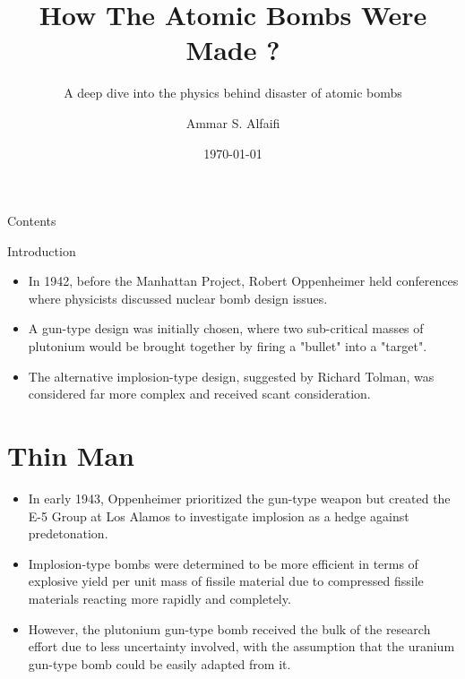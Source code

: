 \documentclass{loyola-beamer}
\title{How The Atomic Bombs Were Made ?}
\subtitle{A deep dive into the physics behind disaster of atomic bombs}
\author{Ammar S. Alfaifi}
\date{\today}
\institute{KFUPM}
\begin{document}
\begin{titleframe}{}
	\maketitle
\end{titleframe}

\begin{frame}{Contents}
	\tableofcontents
\end{frame}

\begin{frame}{Introduction}
	\begin{itemize}
		\item In 1942, before the Manhattan Project, Robert Oppenheimer held conferences where physicists discussed nuclear bomb design issues.
		\item A gun-type design was initially chosen, where two sub-critical masses of plutonium would be brought together by firing a "bullet" into a "target".
		\item The alternative implosion-type design, suggested by Richard Tolman, was considered far more complex and received scant consideration.
	\end{itemize}
\end{frame}

\section{Thin Man}

\begin{frame}
	\begin{itemize}
		\item In early 1943, Oppenheimer prioritized the gun-type weapon but created the E-5 Group at Los Alamos to investigate implosion as a hedge against predetonation.
		\item Implosion-type bombs were determined to be more efficient in terms of explosive yield per unit mass of fissile material due to compressed fissile materials reacting more rapidly and completely.
		\item However, the plutonium gun-type bomb received the bulk of the research effort due to less uncertainty involved, with the assumption that the uranium gun-type bomb could be easily adapted from it.
	\end{itemize}
\end{frame}
\end{document}

